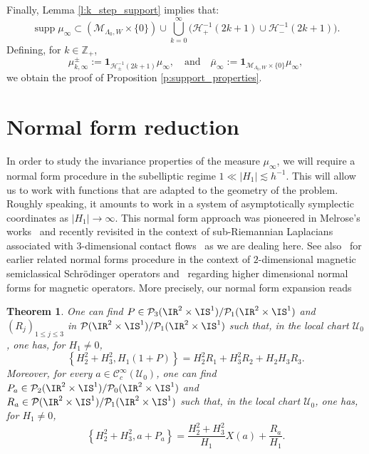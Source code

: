 \documentclass[10pt]{amsart}
\theoremstyle{plain}
\newtheorem{theo}{Theorem}[section]
\theoremstyle{definition}
\theoremstyle{remark}
\begin{document}
Finally, Lemma \ref{l:k_step_support} implies that:
\[
\operatorname{supp}\mu_\infty\subset (\mathcal{M}_{\Lambda_0,W} \times \{ 0 \}) \cup \bigcup_{k=0}^\infty \bigl(\mathcal{H}_+^{-1}(2k+1) \cup \mathcal{H}_-^{-1}(2k+1) \bigr).
\]
Defining, for $k \in \mathbb{Z}_+$,
\[
\mu_{k,\infty}^\pm := \mathbf{1}_{\mathcal{H}_\pm^{-1}(2k+1)} \mu_\infty,\quad \text{and}\quad \overline{\mu}_\infty := \mathbf{1}_{\mathcal{M}_{\Lambda_0,W} \times \{0 \}} \mu_\infty,
\]
we obtain the proof of Proposition \ref{p:support_properties}.

\section{Normal form reduction}\label{s:normalform}

In order to study the invariance properties of the measure $\mu_\infty$, we will require a normal form procedure in the subelliptic regime $1 \ll |H_1| \lesssim h^{-1}$. This will allow us to work with functions that are adapted to the geometry of the problem. Roughly speaking, it amounts to work in a system of asymptotically symplectic coordinates as $|H_1|\to \infty$. This normal form approach was pioneered in Melrose's works~\cite{Melrose85} and recently revisited in the context of sub-Riemannian Laplacians associated with $3$-dimensional contact flows~\cite{ColindeVerdiereHillairetTrelat15, ColindeVerdiereHillairetTrelat21} as we are dealing here. See also~\cite{ RaymondVuNgoc15} for earlier related normal forms procedure in the context of $2$-dimensional magnetic semiclassical Schrödinger operators and~\cite{HelfferKordyukovRaymondVuNgoc16, Morin19, Morin20} regarding higher dimensional normal forms for magnetic operators. More precisely, our normal form expansion reads

\begin{theo}\label{t:normalform} One can find $P\in\mathcal{P}_3(\IR^2\times\IS^1)/\mathcal{P}_1(\IR^2\times\IS^1)$ and $(R_j)_{1\leq j\leq 3}$ in \hbox{$\mathcal{P}(\IR^2\times\IS^1)/\mathcal{P}_1(\IR^2\times\IS^1)$} such that, in the local chart $\mathcal{U}_0$, one has, for $H_1\neq 0$,
\[
\left\{H_2^2+H_3^2,H_1(1+P)\right\}=H_2^2R_1+H_3^2R_2+H_2H_3R_3.
\]
Moreover, for every $a\in\mathcal{C}^\infty_c(\mathcal{U}_0)$, one can find $P_a\in \mathcal{P}_2(\IR^2\times\IS^1)/\mathcal{P}_0(\IR^2\times\IS^1)$ and $R_a\in\mathcal{P}(\IR^2\times\IS^1)/\mathcal{P}_1(\IR^2\times\IS^1)$ such that, in the local chart $\mathcal{U}_0$, one has, for $H_1\neq 0$,
\[
\left\{H_2^2+H_3^2,a+P_a\right\}=\frac{H_2^2+H_3^2}{H_1}X(a)+\frac{R_a}{H_1}.
\]
\end{theo}
\end{document}
